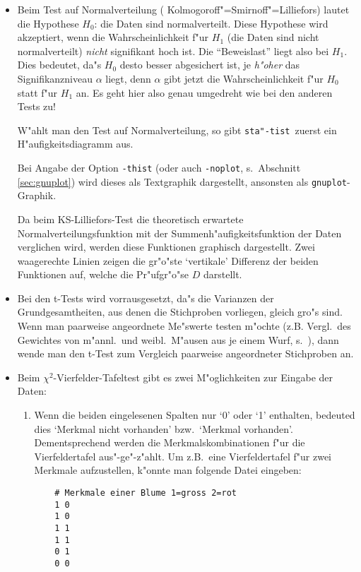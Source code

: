 \documentclass[a4paper,11pt]{article}
\newcommand{\st}{{\tt sta"-tist}}
\begin{document}
\begin{itemize}
\item Beim Test auf Normalverteilung ({\sc
    Kolmogoroff"=Smirnoff"=Lilliefors}) lautet die Hypothese $H_0$: die
  Daten sind normalverteilt. Diese Hypothese wird akzeptiert, wenn die
  Wahrscheinlichkeit f"ur $H_1$ (die Daten sind nicht normalverteilt)
  {\em nicht} signifikant hoch ist. Die "`Beweislast"' liegt also bei
  $H_1$. Dies bedeutet, da"s $H_0$ desto besser abgesichert ist, je
  {\em h"oher} das Signifikanzniveau $\alpha$ liegt, denn $\alpha$ gibt
  jetzt die Wahrscheinlichkeit f"ur $H_0$ statt f"ur $H_1$ an. Es geht
  hier also genau umgedreht wie bei den anderen Tests zu!

  W"ahlt man den Test auf Normalverteilung, so gibt \st\ zuerst ein
  H"aufigkeitsdiagramm aus.

  Bei Angabe der Option {\tt -thist} (oder auch {\tt -noplot}, s.\
  Abschnitt \ref{sec:gnuplot}) wird dieses als Textgraphik
  dargestellt, ansonsten als {\tt gnuplot}-Graphik.
  
  Da beim {\sc KS-Lilliefors}-Test die theoretisch erwartete
  Normalverteilungsfunktion mit der Summenh"aufigkeitsfunktion der 
  Daten verglichen wird, werden diese Funktionen graphisch
  dargestellt. Zwei waagerechte Linien zeigen die gr"o"ste `vertikale'
  Differenz der beiden Funktionen auf, welche die Pr"ufgr"o"se $D$
  darstellt.
\item Bei den t-Tests wird vorrausgesetzt, da"s die Varianzen der
  Grundgesamtheiten, aus denen die Stichproben vorliegen, gleich gro"s
  sind. Wenn man paarweise angeordnete Me"swerte testen m"ochte (z.B.
  Vergl.\ des Gewichtes von m"annl.\ und weibl.\ M"ausen aus je einem
  Wurf, s.\ \cite[S. 175 f]{weber86}), dann wende man den t-Test zum
  Vergleich paarweise angeordneter Stichproben an.
\item Beim $\chi^2$-Vierfelder-Tafeltest gibt es zwei M"oglichkeiten
  zur Eingabe der Daten:
  \begin{enumerate}
  \item Wenn die beiden eingelesenen Spalten nur `0' oder `1'
    enthalten, bedeuted dies `Merkmal nicht vorhanden' bzw.\ `Merkmal
     vorhanden'. Dementsprechend werden die Merkmalskombinationen
    f"ur die Vierfeldertafel aus"-ge"-z"ahlt. Um z.B.\ eine Vierfeldertafel
    f"ur zwei Merkmale aufzustellen, k"onnte man folgende Datei eingeben:

    \begin{verbatim}
    # Merkmale einer Blume 1=gross 2=rot
    1 0
    1 0
    1 1
    1 1
    0 1
    0 0
    \end{verbatim}


\end{enumerate}
\end{itemize}
\end{document}
